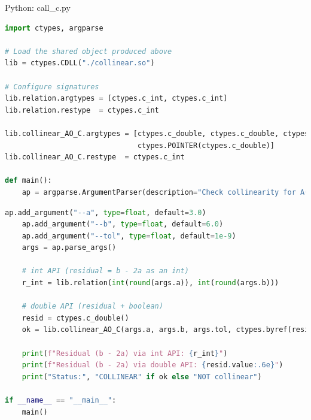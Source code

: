 \documentclass{beamer}
\begin{document}
\begin{frame}[fragile]{Python: call\_c.py}
\begin{lstlisting}[language=Python]
import ctypes, argparse

# Load the shared object produced above
lib = ctypes.CDLL("./collinear.so")

# Configure signatures
lib.relation.argtypes = [ctypes.c_int, ctypes.c_int]
lib.relation.restype  = ctypes.c_int

lib.collinear_AO_C.argtypes = [ctypes.c_double, ctypes.c_double, ctypes.c_double,
                               ctypes.POINTER(ctypes.c_double)]
lib.collinear_AO_C.restype  = ctypes.c_int

def main():
    ap = argparse.ArgumentParser(description="Check collinearity for A(1,2), O(0,0), C(a,b)")
    \end{lstlisting}
\end{frame}
\begin{frame}[fragile]
\begin{lstlisting}[language=Python]
    ap.add_argument("--a", type=float, default=3.0)
    ap.add_argument("--b", type=float, default=6.0)
    ap.add_argument("--tol", type=float, default=1e-9)
    args = ap.parse_args()

    # int API (residual = b - 2a as an int)
    r_int = lib.relation(int(round(args.a)), int(round(args.b)))

    # double API (residual + boolean)
    resid = ctypes.c_double()
    ok = lib.collinear_AO_C(args.a, args.b, args.tol, ctypes.byref(resid))

    print(f"Residual (b - 2a) via int API: {r_int}")
    print(f"Residual (b - 2a) via double API: {resid.value:.6e}")
    print("Status:", "COLLINEAR" if ok else "NOT collinear")

if __name__ == "__main__":
    main()

\end{lstlisting}
\end{frame}
\end{document}
